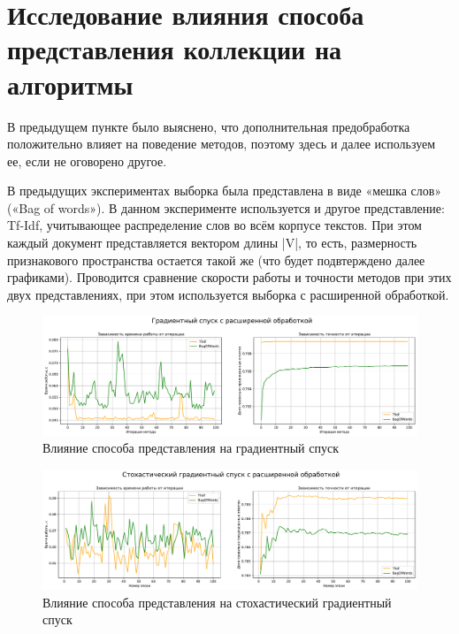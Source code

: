 \documentclass{article}
\begin{document}

\section{Исследование влияния способа представления коллекции на алгоритмы}

В предыдущем пункте было выяснено, что дополнительная предобработка положительно влияет на поведение методов, поэтому здесь и далее используем ее, если не оговорено другое. 

В предыдущих экспериментах выборка была представлена в виде «мешка слов» («Bag of words»). В данном эксперименте используется и другое представление: Tf-Idf, учитывающее распределение слов во всём корпусе текстов. При этом каждый документ представляется вектором длины |V|, то есть, размерность признакового пространства остается такой же (что будет подвтерждено далее графиками). Проводится сравнение скорости работы и точности методов при этих двух представлениях, при этом используется выборка с расширенной обработкой.

\begin{figure}[H]
	\centering
	\includegraphics[width=15cm]{TASK2 GDC Tfidf.pdf}
	\caption{Влияние способа представления на градиентный спуск}
	\label{fig:GDC_Tfidf}
\end{figure}
\begin{figure}[H]
	\centering
	\includegraphics[width=15cm]{TASK2 SGDC Tfidf.pdf}
	\caption{Влияние способа представления на стохастический градиентный спуск}
	\label{fig:SGDC_Tfidf}
\end{figure}
\end{document}
